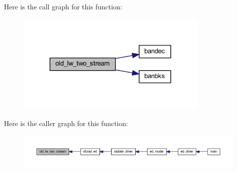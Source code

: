 Here is the call graph for this function\+:\nopagebreak
\begin{figure}[H]
\begin{center}
\leavevmode
\includegraphics[width=263pt]{old__twostream__rad_8f90_abcc634b5076b1fe8fb168a33555a3fd2_cgraph}
\end{center}
\end{figure}




Here is the caller graph for this function\+:\nopagebreak
\begin{figure}[H]
\begin{center}
\leavevmode
\includegraphics[width=350pt]{old__twostream__rad_8f90_abcc634b5076b1fe8fb168a33555a3fd2_icgraph}
\end{center}
\end{figure}



